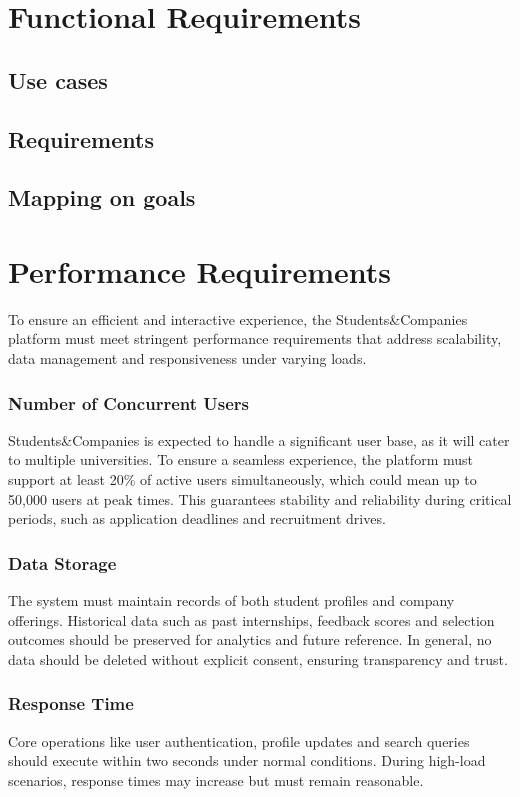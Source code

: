 \section{Functional Requirements}
\subsection{Use cases}
\subsection{Requirements}
\subsection{Mapping on goals}
\section{Performance Requirements}
To ensure an efficient and interactive experience, the Students\&Companies platform must meet stringent performance requirements that address scalability, data management and responsiveness under varying loads.

\subsubsection{Number of Concurrent Users}
Students\&Companies is expected to handle a significant user base, as it will cater to multiple universities.
To ensure a seamless experience, the platform must support at least 20\% of active users simultaneously, which could mean up to 50,000 users at peak times.
This guarantees stability and reliability during critical periods, such as application deadlines and recruitment drives.

\subsubsection{Data Storage}
The system must maintain records of both student profiles and company offerings.
Historical data such as past internships, feedback scores and selection outcomes should be preserved for analytics and future reference.
In general, no data should be deleted without explicit consent, ensuring transparency and trust.

\subsubsection{Response Time}
Core operations like user authentication, profile updates and search queries should execute within two seconds under normal conditions.
During high-load scenarios, response times may increase but must remain reasonable.

